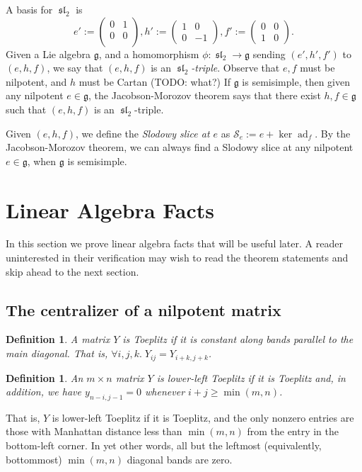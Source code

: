 \documentclass[12pt,psamsfonts]{article}
\DeclareMathOperator{\spl}{\mathfrak{sl}}
\DeclareMathOperator{\ad}{ad}
\newtheorem{definition}[theorem]{Definition}
\begin{document}
A basis for \(\spl_2\) is
\[e' := \begin{pmatrix}0 & 1 \\ 0 & 0 \\\end{pmatrix}, h' := \begin{pmatrix}1 & 0 \\0 & -1\end{pmatrix}, f' := \begin{pmatrix}0 & 0 \\1 & 0\end{pmatrix}.\]
Given a Lie algebra \(\mathfrak{g}\), and a homomorphism \(\phi : \spl_2 \to \mathfrak{g}\) sending \((e', h', f')\) to \((e, h, f)\), we say that \((e, h, f)\) is an \emph{\(\spl_2\)-triple}.
Observe that \(e, f\) must be nilpotent, and \(h\) must be Cartan (TODO: what?)
If \(\mathfrak{g}\) is semisimple, then given any nilpotent \(e \in \mathfrak{g}\), the Jacobson-Morozov theorem \cite[3.7.1]{ehf} says that there exist \(h, f \in \mathfrak{g}\) such that \((e, h, f)\) is an \(\spl_2\)-triple.
\par Given \((e, h, f)\), we define the \emph{Slodowy slice at \(e\)} as \(\mathcal{S}_e := e + \ker \ad_f\).
By the Jacobson-Morozov theorem, we can always find a Slodowy slice at any nilpotent \(e \in \mathfrak{g}\), when \(\mathfrak{g}\) is semisimple.

\section{Linear Algebra Facts}
In this section we prove linear algebra facts that will be useful later.
A reader uninterested in their verification may wish to read the theorem statements and skip ahead to the next section.

\subsection{The centralizer of a nilpotent matrix}
\begin{definition}
    A matrix \(Y\) is \emph{Toeplitz} if it is constant along bands parallel to the main diagonal.
    That is, \(\forall i,j,k. \; Y_{ij} = Y_{i + k, j + k}\).
\end{definition}
\begin{definition}
    An \(m \times n\) matrix \(Y\) is \emph{lower-left Toeplitz} if it is Toeplitz and, in addition, we have \(y_{n - i, j - 1} = 0\) whenever \(i + j \geq \min(m,n)\).
\end{definition}
That is, \(Y\) is lower-left Toeplitz if it is Toeplitz, and the only nonzero entries are those with Manhattan distance less than \(\min(m,n)\) from the entry in the bottom-left corner.
In yet other words, all but the leftmost (equivalently, bottommost) \(\min(m,n)\) diagonal bands are zero.
\end{document}
